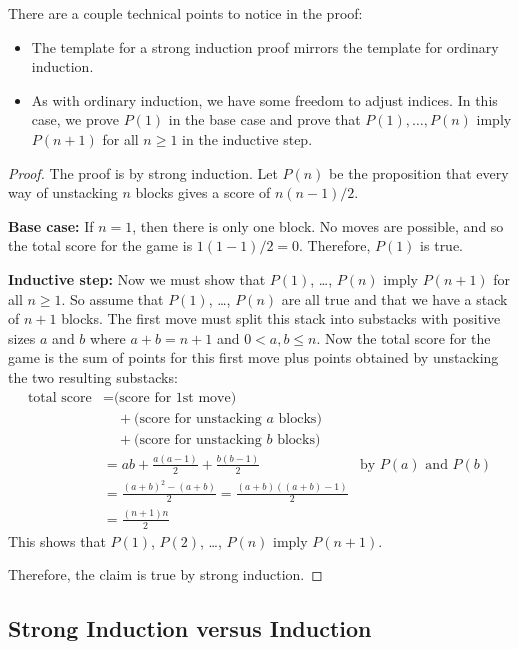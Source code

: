 There are a couple technical points to notice in the proof:

\begin{itemize}

\item The template for a strong induction proof mirrors the template
for ordinary induction.

\item As with ordinary induction, we have some freedom to adjust indices.
In this case, we prove $P(1)$ in the base case and prove that $P(1),
\dots, P(n)$ imply $P(n+1)$ for all $n \geq 1$ in the inductive step.

\end{itemize}

\begin{proof}
The proof is by strong induction.  Let $P(n)$ be the proposition that
every way of unstacking $n$ blocks gives a score of $n(n-1)/2$.

\textbf{Base case:} If $n = 1$, then there is only one
block.  No moves are possible, and so the total score for the game is
$1(1 - 1)/2 = 0$.  Therefore, $P(1)$ is true.

\textbf{Inductive step:} Now we must show that $P(1)$, \dots, $P(n)$ imply
$P(n+1)$ for all $n \geq 1$.  So assume that $P(1)$, \dots, $P(n)$ are all
true and that we have a stack of $n+1$ blocks.  The first move must split
this stack into substacks with positive sizes $a$ and $b$ where $a+b =
n+1$ and $0<a,b\leq n$.  Now the total score for the game is the sum of
points for this first move plus points obtained by unstacking the two
resulting substacks:
%
\begin{align*}
\text{total score}
    & = \text{(score for 1st move)} \\
    & \quad + \text{(score for unstacking $a$ blocks)} \\
    & \quad + \text{(score for unstacking $b$ blocks)} \\
    & = ab + \frac{a(a-1)}{2} + \frac{b(b-1)}{2} & \text{by $P(a)$ and $P(b)$}\\
    & = \frac{(a+b)^2-(a+b)}{2} = \frac{(a+b)((a+b)-1)}{2}\\
    & = \frac{(n+1)n}{2}
\end{align*}
%
This shows that $P(1)$, $P(2)$, \dots, $P(n)$ imply $P(n+1)$.

Therefore, the claim is true by strong induction.
\end{proof}

\subsection{Strong Induction versus Induction} 

